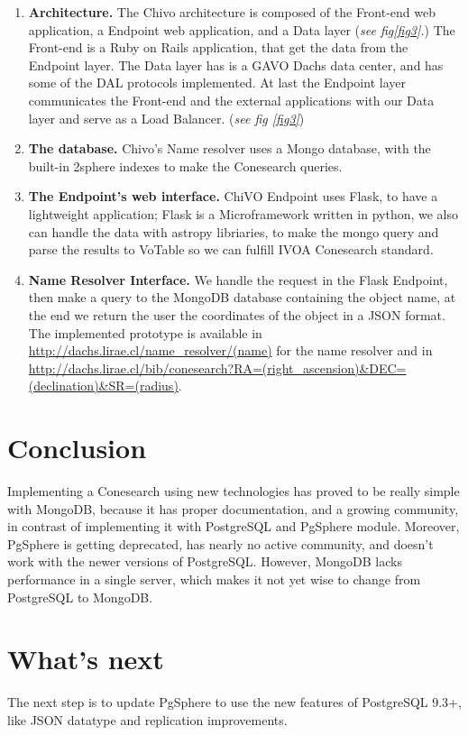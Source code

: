 \documentclass[11pt,twoside]{article}
\begin{document}
\begin{enumerate}

\item  \textbf{Architecture.}  The Chivo architecture is composed of the Front-end web application, a Endpoint web application,
and a Data layer (\emph{see fig\ref{fig3}.}) The Front-end is a Ruby on Rails application, that get the data from the Endpoint layer. 
The Data layer has is a GAVO Dachs data center, and has some of the DAL protocols implemented.
At last the Endpoint layer communicates the Front-end and the external applications with our Data layer and serve as a Load Balancer. (\emph{see fig \ref{fig3}})


\item  \textbf{The database.} Chivo's Name resolver uses a Mongo database, with the built-in 2sphere indexes 
to make the Conesearch queries. 

\item  \textbf{The Endpoint’s web interface.} ChiVO Endpoint uses Flask, to have a lightweight application; 
Flask is a Microframework written in python, we also can handle the data with astropy
libriaries, to make the mongo query and parse the results to VoTable so we can fulfill IVOA Conesearch standard.

\item \textbf{Name Resolver Interface.} We handle the request in the Flask Endpoint,
then make a query to the MongoDB database containing the object name, at the end we return the user the coordinates of the object 
in a JSON format. The implemented prototype is available in \url{http://dachs.lirae.cl/name_resolver/(name)} for the name resolver
and in \url{http://dachs.lirae.cl/bib/conesearch?RA=(right_ascension)&DEC=(declination)&SR=(radius)}.

\end{enumerate}

\section{Conclusion}
    Implementing a Conesearch using new technologies has proved to be really
simple with MongoDB, because it has proper documentation, 
and a growing community, in contrast of implementing it with PostgreSQL and
PgSphere module. Moreover,  PgSphere is getting deprecated, has nearly no active
community, and doesn't work with the newer versions of PostgreSQL. 
However,  MongoDB lacks performance in a single server, which makes it not yet
wise to change from PostgreSQL to MongoDB.

\section{What's next}
  The next step is to update PgSphere to use the new features of PostgreSQL 9.3+, like JSON datatype and replication improvements.



\end{document}
